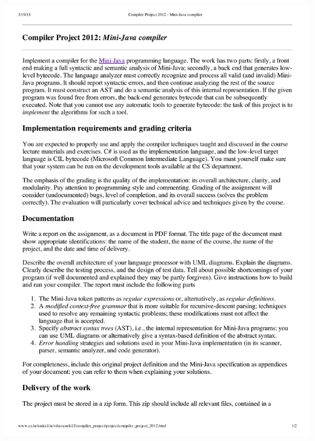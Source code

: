 \documentclass[a4paper,11pt]{article}
\begin{document}
\includegraphics[width=1.0\textwidth,page=1]{project.pdf}
\end{document}
